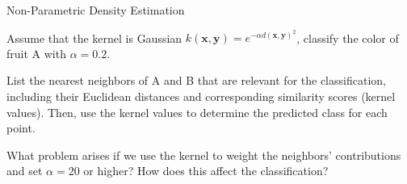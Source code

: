 \documentclass[
	english,
        solution=true
	]{tudaexercise}
\begin{document}
\begin{task}[points=9]{Non-Parametric Density Estimation}
\begin{subtask}[points=7]

Assume that the kernel is Gaussian $k(\boldsymbol{x}, \boldsymbol{y}) = e^{-\alpha d(\boldsymbol{x}, \boldsymbol{y})^2}$, classify the color of fruit A with $\alpha=0.2$. 

List the nearest neighbors of A and B that are relevant for the classification, including their Euclidean distances and corresponding similarity scores (kernel values). Then, use the kernel values to determine the predicted class for each point.

\begin{solution}

\end{solution}
\end{subtask}

\begin{subtask}[points=2]
What problem arises if we use the kernel to weight the neighbors’ contributions and set $\alpha = 20$ or higher? How does this affect the classification?
\end{subtask}

\begin{solution}

\end{solution}
\end{task}

\newpage
\end{document}
